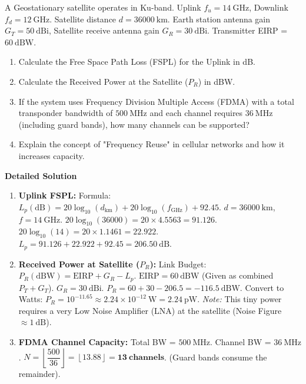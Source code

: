 \documentclass[11pt]{article}
\begin{document}
\begin{exoresolu}
A Geostationary satellite operates in Ku-band. Uplink $f_u = 14\ \mathrm{GHz}$, Downlink $f_d = 12\ \mathrm{GHz}$. Satellite distance $d = 36000\ \mathrm{km}$. Earth station antenna gain $G_T = 50\ \mathrm{dBi}$, Satellite receive antenna gain $G_R = 30\ \mathrm{dBi}$. Transmitter EIRP = $60\ \mathrm{dBW}$.
\begin{enumerate}
\item Calculate the Free Space Path Loss (FSPL) for the Uplink in dB.
\item Calculate the Received Power at the Satellite ($P_R$) in dBW.
\item If the system uses Frequency Division Multiple Access (FDMA) with a total transponder bandwidth of $500\ \mathrm{MHz}$ and each channel requires $36\ \mathrm{MHz}$ (including guard bands), how many channels can be supported?
\item Explain the concept of "Frequency Reuse" in cellular networks and how it increases capacity.
\end{enumerate}
\tcblower
\textbf{Detailed Solution}
\begin{enumerate}
\item \textbf{Uplink FSPL:}
Formula: $L_p(\mathrm{dB}) = 20\log_{10}(d_{\mathrm{km}}) + 20\log_{10}(f_{\mathrm{GHz}}) + 92.45$.
$d = 36000\ \mathrm{km}$, $f = 14\ \mathrm{GHz}$.
$20\log_{10}(36000) = 20 \times 4.5563 = 91.126$.
$20\log_{10}(14) = 20 \times 1.1461 = 22.922$.
$L_p = 91.126 + 22.922 + 92.45 = 206.50\ \mathrm{dB}$.

\item \textbf{Received Power at Satellite ($P_R$):}
Link Budget: $P_R (\mathrm{dBW}) = \mathrm{EIRP} + G_R - L_p$.
$\mathrm{EIRP} = 60\ \mathrm{dBW}$ (Given as combined $P_T + G_T$).
$G_R = 30\ \mathrm{dBi}$.
$P_R = 60 + 30 - 206.5 = -116.5\ \mathrm{dBW}$.
Convert to Watts: $P_R = 10^{-11.65} \approx 2.24 \times 10^{-12}\ \mathrm{W} = 2.24\ \mathrm{pW}$.
\textit{Note:} This tiny power requires a very Low Noise Amplifier (LNA) at the satellite (Noise Figure $\approx 1\ \mathrm{dB}$).

\item \textbf{FDMA Channel Capacity:}
Total BW = $500\ \mathrm{MHz}$. Channel BW = $36\ \mathrm{MHz}$.
$N = \left\lfloor \dfrac{500}{36} \right\rfloor = \left\lfloor 13.88 \right\rfloor = \mathbf{13\ \text{channels}}$.
(Guard bands consume the remainder).


\end{enumerate}
\end{exoresolu}
\end{document}
